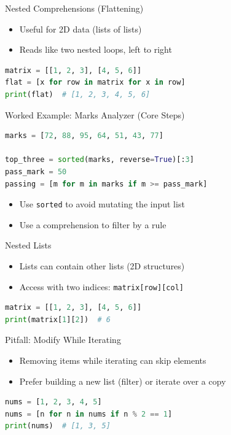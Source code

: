 \documentclass{beamer}
\begin{document}
\begin{frame}[fragile]{Nested Comprehensions (Flattening)}
  \begin{itemize}[<+->]
    \item Useful for 2D data (lists of lists)
    \item Reads like two nested loops, left to right
  \end{itemize}
  \vspace{0.3em}
  \begin{lstlisting}[language=Python]
matrix = [[1, 2, 3], [4, 5, 6]]
flat = [x for row in matrix for x in row]
print(flat)  # [1, 2, 3, 4, 5, 6]
  \end{lstlisting}
\end{frame}

\begin{frame}[fragile]{Worked Example: Marks Analyzer (Core Steps)}
  \begin{lstlisting}[language=Python]
marks = [72, 88, 95, 64, 51, 43, 77]

top_three = sorted(marks, reverse=True)[:3]
pass_mark = 50
passing = [m for m in marks if m >= pass_mark]
  \end{lstlisting}
  \begin{itemize}[<+->]
    \item Use \texttt{sorted} to avoid mutating the input list
    \item Use a comprehension to filter by a rule
  \end{itemize}
\end{frame}

\begin{frame}[fragile]{Nested Lists}
  \begin{itemize}[<+->]
    \item Lists can contain other lists (2D structures)
    \item Access with two indices: \texttt{matrix[row][col]}
  \end{itemize}
  \vspace{0.4em}
  \begin{lstlisting}[language=Python]
matrix = [[1, 2, 3], [4, 5, 6]]
print(matrix[1][2])  # 6
  \end{lstlisting}
\end{frame}

\begin{frame}[fragile]{Pitfall: Modify While Iterating}
  \begin{itemize}[<+->]
    \item Removing items while iterating can skip elements
    \item Prefer building a new list (filter) or iterate over a copy
  \end{itemize}
  \vspace{0.4em}
  \begin{lstlisting}[language=Python]
nums = [1, 2, 3, 4, 5]
nums = [n for n in nums if n % 2 == 1]
print(nums)  # [1, 3, 5]
  \end{lstlisting}
\end{frame}
\end{document}

